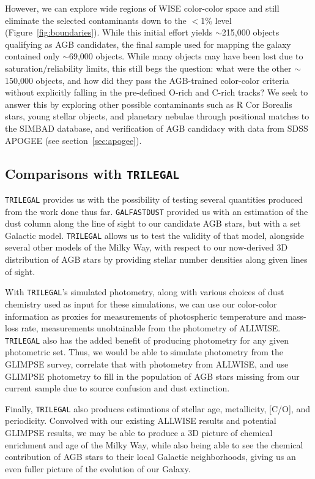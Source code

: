  However, we can explore wide regions of WISE color-color space and still eliminate the selected contaminants down to the $<$1\% level (Figure~\ref{fig:boundaries}). While this initial effort yields $\sim$215,000 objects qualifying as AGB candidates, the final sample used for mapping the galaxy contained only $\sim$69,000 objects. While many objects may have been lost due to saturation/reliability limits, this still begs the question: what were the other $\sim$150,000 objects, and how did they pass the AGB-trained color-color criteria without explicitly falling in the pre-defined O-rich and C-rich tracks? We seek to answer this by exploring other possible contaminants such as R Cor Borealis stars, young stellar objects, and planetary nebulae \citep{2002MNRAS.337..749J} through positional matches to the SIMBAD database, and verification of AGB candidacy with data from SDSS APOGEE (see section~\ref{sec:apogee}).

\subsection{Comparisons with {\tt TRILEGAL}}
{\tt TRILEGAL} \citep{2005A&A...436..895G, 2007ASPC..378...20G} provides us with the possibility of testing several quantities produced from the work done thus far. {\tt GALFASTDUST} provided us with an estimation of the dust column along the line of sight to our candidate AGB stars, but with a set Galactic model. {\tt TRILEGAL}  allows us to test the validity of that model, alongside several other models of the Milky Way, with respect to our now-derived 3D distribution of AGB stars by providing stellar number densities along given lines of sight.

With {\tt TRILEGAL}'s simulated photometry, along with various choices of dust chemistry used as input for these simulations, we can use our color-color information as proxies for measurements of photospheric temperature and mass-loss rate, measurements unobtainable from the photometry of ALLWISE. {\tt TRILEGAL} also has the added benefit of producing photometry for any given photometric set. Thus, we would be able to simulate photometry from the GLIMPSE survey, correlate that with photometry from ALLWISE, and use GLIMPSE photometry to fill in the population of AGB stars missing from our current sample due to source confusion and dust extinction. 

Finally, {\tt TRILEGAL} also produces estimations of stellar age, metallicity, [C/O], and periodicity. Convolved with our existing ALLWISE results and potential GLIMPSE results, we may be able to produce a 3D picture of chemical enrichment and age of the Milky Way, while also being able to see the chemical contribution of AGB stars to their local Galactic neighborhoods, giving us an even fuller picture of the evolution of our Galaxy.

